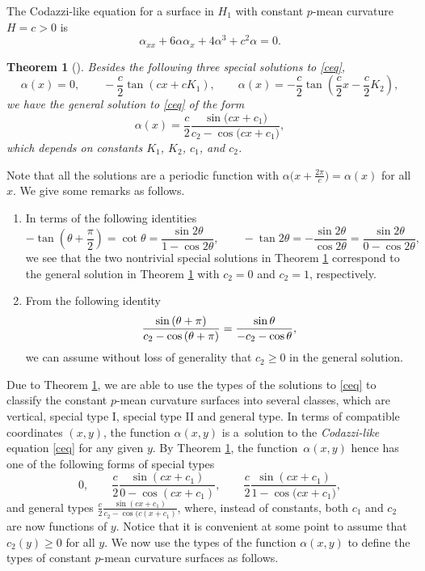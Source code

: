 \documentclass[10pt,a4paper]{amsart}
\numberwithin{equation}{section}
\newtheorem{Theorem}{Theorem}[section]
\begin{document}
The Codazzi-like equation for a surface in $H_1$ with constant $p$-mean
curvature $H=c>0$ is
\begin{equation} \label{ceq}
\alpha_{xx}+6\alpha \alpha_{x}+4\alpha^{3}+c^2\alpha=0.
\end{equation}

\begin{Theorem}[\cite{ChiuH/LiuH:2022}]
\label{consta1} Besides the following three special solutions to \eqref{ceq},
\[
\alpha(x)=0,\qquad -\frac{c}{2}\tan(cx+cK_1),\qquad \alpha(x)=-\frac{c}{2}\tan\left(\frac{c%
}{2}x-\frac{c}{2}K_2\right),
\]
we have the general solution to \eqref{ceq} of the form
\begin{equation*}
\alpha(x)=\frac{c}{2}\frac{\sin{\bigl(cx+c_{1}\bigr)}}{c_{2}-\cos{\bigl(cx+c_{1}%
\bigr)}},
\end{equation*}
which depends on constants $K_{1}$, $K_{2}$, $c_1$, and $c_2$.
\end{Theorem}

Note that all the solutions are a periodic function with $\alpha\bigl(x+\frac{2\pi%
}{c}\bigr)=\alpha(x)$ for all $x$. We give some remarks as follows.
\begin{enumerate}\itemsep=0pt
\item[(1)] In terms of the following identities
\begin{equation*}
-\tan{\left(\theta+\frac{\pi}{2}\right)}=\cot{\theta}=\frac{\sin{2\theta}}{1-\cos{2\theta}},\qquad
-\tan{2\theta}=-\frac{\sin{2\theta}}{\cos{2\theta}}=\frac{\sin{2\theta}}{0-\cos{2\theta}},
\end{equation*}
we see that the two nontrivial special solutions in Theorem \ref{consta1}
correspond to the general solution in Theorem \ref{consta1} with $c_{2}=0$ and $c_{2}=1$, respectively.
\item[(2)] From the following identity
\[
\frac{\sin{(\theta+\pi)}}{c_{2}-\cos{(\theta+\pi)}}=\frac{\sin{\theta}}{%
-c_{2}-\cos{\theta}},
\]
we can assume without loss of generality that $c_{2}\geq 0$ in the general
solution.
\end{enumerate}



Due to Theorem \ref{consta1}, we are able to use the types of the solutions
to \eqref{ceq} to classify the constant $p$-mean curvature surfaces into
several classes, which are vertical, special type I, special type II and
general type. In terms of compatible coordinates $(x,y)$, the function $\alpha(x,y)$ is a~solution to the \emph{Codazzi-like} equation \eqref{ceq}
for any given $y$. By Theorem \ref{consta1}, the function~$\alpha(x,y)$
hence has one of the following forms of special types
\[
0,\qquad \frac{c}{2}\frac{\sin(cx+c_1)}{0-\cos(cx+c_1)},\qquad
\frac{c}{2}\frac{\sin{(cx+c_{1})}}{1-\cos{\bigl(cx+c_{1})}},
\]
and general types
$
\frac{c}{2}\frac{\sin{(cx+c_{1})}}{c_{2}-\cos{(c(x+c_{1})}}$,
where, instead of constants, both $c_{1}$ and $c_{2}$ are now functions of $%
y $. Notice that it is convenient at some point to assume that $c_{2}(y)\geq0$ for all $y$. We now use the types of the
function $\alpha(x,y)$ to define the types of constant $p$-mean curvature
surfaces as follows.
\end{document}
